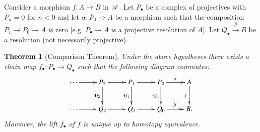 \documentclass[1p]{elsarticle}
\theoremstyle{mythm}
\newtheorem{Thm}{Theorem}[section]
\theoremstyle{mydef}
\begin{document}
Consider a morphism $f: A \to B$ in $\operatorname{\mathscr{A}}$.
Let $P_{\bullet}$ be a complex of projectives with $P_n = 0$ for 
$n < 0$ and let $\alpha: P_0 \to A$ be a morphism such that the composition
$P_1 \to P_0 \to A$ is zero
[e.g. $P_{\bullet} \to A$ is a projective resolution of $A$].
Let $Q_{\bullet} \xrightarrow{\beta} B$ be a resolution (not
necessarily projective).

\begin{Thm}[Comparison Theorem]
  \label{thm:comparison-theorem}
  Under the above hypotheses there exists a chain map
  $f_\bullet: P_\bullet \to Q_\bullet$
  such that the following diagram commutes:
  \[
  \xymatrix{
    \cdots \ar[r] & 
    P_2 \ar[r] \ar[d]_{\exists f_2} &
    P_1 \ar[r] \ar[d]_{\exists f_1} &
    P_0 \ar[r]^\alpha \ar[d]_{\exists f_0} &
    A \ar[d]_{f} \\
    \cdots \ar[r] &
    Q_2 \ar[r] &
    Q_1 \ar[r] &
    Q_0 \ar@{->>}[r]^\beta &
    B.
  }
  \]
  Moreover, the \emph{lift} $f_\bullet$ of $f$ is unique up to
  homotopy equivalence.
\end{Thm}
\end{document}
